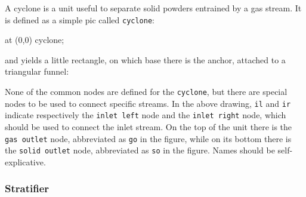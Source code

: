 \documentclass[12pt]{article}						%
\newcommand*{\chpn}[1]{\texttt{#1}}				%
\newcommand*{\chpp}[1]{\texttt{#1}}				%
\begin{document}
A cyclone is a unit useful to separate solid powders entrained by a gas stream.
It is defined as a simple pic called \chpp{cyclone}:
\begin{chpcode}
	\pic at (0,0) {cyclone};
\end{chpcode}
and yields a little rectangle, on which base there is the anchor, attached to a
triangular funnel:
\begin{center}
\end{center}

None of the common nodes are defined for the \chpn{cyclone}, but there are
special nodes to be used to connect specific streams. In the above drawing,
\chpn{il} and \chpn{ir} indicate respectively the \chpn{inlet left} node and the
\chpn{inlet right} node, which should be used to connect the inlet stream. On
the top of the unit there is the \chpn{gas outlet} node, abbreviated as
\chpn{go} in the figure, while on its bottom there is the \chpn{solid outlet}
node, abbreviated as \chpn{so} in the figure. Names should be self-explicative.

\subsubsection{Stratifier}
\end{document}
